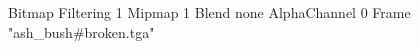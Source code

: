 {Bitmap
	{Filtering 1}
	{Mipmap 1}
	{Blend none}
	{AlphaChannel 0}
	{Frame "ash_bush#broken.tga"}
}
